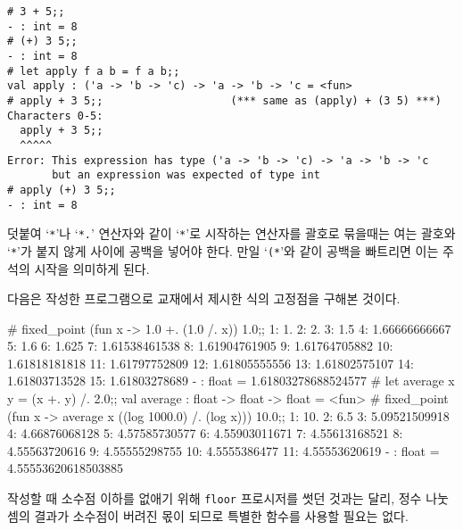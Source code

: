 \begin{lstlisting}
# 3 + 5;;
- : int = 8
# (+) 3 5;;
- : int = 8
# let apply f a b = f a b;;
val apply : ('a -> 'b -> 'c) -> 'a -> 'b -> 'c = <fun>
# apply + 3 5;;                    (*** same as (apply) + (3 5) ***)
Characters 0-5:
  apply + 3 5;;
  ^^^^^
Error: This expression has type ('a -> 'b -> 'c) -> 'a -> 'b -> 'c
       but an expression was expected of type int
# apply (+) 3 5;;
- : int = 8
\end{lstlisting}

덧붙여 `\texttt{*}'나 `\texttt{*.}' 연산자와 같이 `\texttt{*}'로 시작하는
연산자를 괄호로 묶을때는 여는 괄호와 `\texttt{*}'가 붙지 않게 사이에 공백을
넣어야 한다. 만일 `\texttt{(*}'와 같이 공백을 빠트리면 이는 주석의 시작을
의미하게 된다.

\exercise{1.33}

\exercise{1.36}

다음은 작성한 프로그램으로 교재에서 제시한 식의 고정점을 구해본 것이다.

\begin{ocaml}
# fixed_point (fun x -> 1.0 +. (1.0 /. x)) 1.0;;
1: 1.
2: 2.
3: 1.5
4: 1.66666666667
5: 1.6
6: 1.625
7: 1.61538461538
8: 1.61904761905
9: 1.61764705882
10: 1.61818181818
11: 1.61797752809
12: 1.61805555556
13: 1.61802575107
14: 1.61803713528
15: 1.61803278689
- : float = 1.61803278688524577
# let average x y = (x +. y) /. 2.0;;
val average : float -> float -> float = <fun>
# fixed_point (fun x -> average x ((log 1000.0) /. (log x))) 10.0;;
1: 10.
2: 6.5
3: 5.09521509918
4: 4.66876068128
5: 4.57585730577
6: 4.55903011671
7: 4.55613168521
8: 4.55563720616
9: 4.55555298755
10: 4.5555386477
11: 4.55553620619
- : float = 4.55553620618503885
\end{ocaml}

\exercise{1.37}

\exercise{1.38}

 작성할 때 소수점 이하를 없애기 위해 \texttt{floor} 프로시저를
썻던 것과는 달리,  정수 나눗셈의 결과가 소수점이 버려진 몫이 되므로
특별한 함수를 사용할 필요는 없다.

\exercise{1.39}

